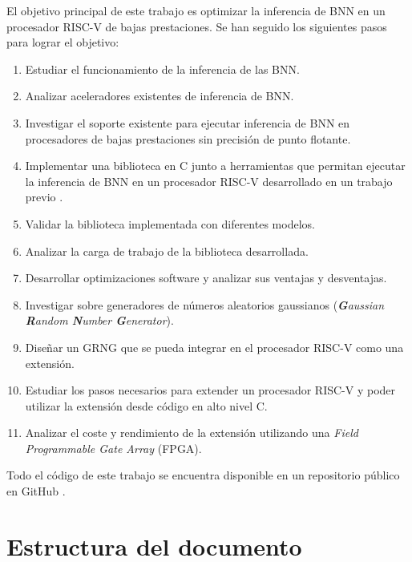 El objetivo principal de este trabajo es optimizar la inferencia de BNN en un procesador RISC-V de bajas prestaciones. Se han seguido los siguientes pasos para lograr el objetivo:
\begin{enumerate}
	\item Estudiar el funcionamiento de la inferencia de las BNN.
	\item Analizar aceleradores existentes de inferencia de BNN.
	\item Investigar el soporte existente para ejecutar inferencia de BNN en procesadores de bajas prestaciones sin precisión de punto flotante.
	\item Implementar una biblioteca en C junto a herramientas que permitan ejecutar la inferencia de BNN en un procesador RISC-V desarrollado en un trabajo previo \cite{riscv_tfg}.
	\item Validar la biblioteca implementada con diferentes modelos.
	\item Analizar la carga de trabajo de la biblioteca desarrollada.
	\item Desarrollar optimizaciones software y analizar sus ventajas y desventajas.
	\item Investigar sobre generadores de números aleatorios gaussianos (\textit{\textbf{G}aussian \textbf{R}andom \textbf{N}umber \textbf{G}enerator}).
	\item Diseñar un GRNG que se pueda integrar en el procesador RISC-V como una extensión.
	\item Estudiar los pasos necesarios para extender un procesador RISC-V y poder utilizar la extensión desde código en alto nivel C.
	\item Analizar el coste y rendimiento de la extensión utilizando una \textit{Field Programmable Gate Array} (FPGA).
\end{enumerate}

Todo el código de este trabajo se encuentra disponible en un repositorio público en GitHub \cite{bnn_github}.


\section{Estructura del documento}

